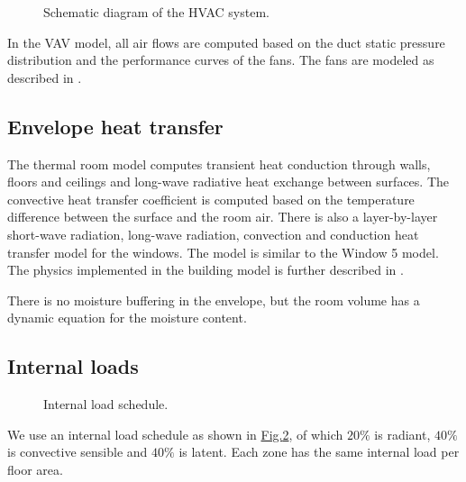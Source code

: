 \documentclass[letterpaper,10pt, openany,english]{sphinxmanual}
\begin{document}
\begin{figure}[htbp]
\centering
\capstart

\noindent{}
\caption{Schematic diagram of the HVAC system.}\label{\detokenize{example:id15}}\label{\detokenize{example:fig-vav-schematics}}\end{figure}

In the VAV model, all air flows are computed based on the
duct static pressure distribution and the performance curves of the fans.
The fans are modeled as described in .


\subsection{Envelope heat transfer}
\label{\detokenize{example:envelope-heat-transfer}}
The thermal room model computes transient heat conduction through
walls, floors and ceilings and long-wave radiative heat exchange between
surfaces. The convective heat transfer coefficient is computed based
on the temperature difference between the surface and the room air.
There is also a layer-by-layer short-wave radiation,
long-wave radiation, convection and conduction heat transfer model for the
windows. The model is similar to the
Window 5 model.
The physics implemented in the building model is further described in
.

There is no moisture buffering in the envelope, but the room volume
has a dynamic equation for the moisture content.


\subsection{Internal loads}
\label{\detokenize{example:internal-loads}}\label{\detokenize{example:sec-int-gai}}
\begin{figure}[htbp]
\centering
\capstart

\noindent{}
\caption{Internal load schedule.}\label{\detokenize{example:id16}}\label{\detokenize{example:fig-internal-loads}}\end{figure}

We use an internal load schedule as shown in
\hyperref[\detokenize{example:fig-internal-loads}]{Fig.\@ \ref{\detokenize{example:fig-internal-loads}}}, of which
\(20\%\) is radiant,
\(40\%\) is convective sensible and
\(40\%\) is latent.
Each zone has the same internal load per floor area.
\end{document}
